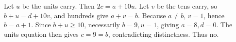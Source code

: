 Let $u$ be the units carry. Then $2c=a+10u$. Let $v$ be the tens carry, so $b+u=d+10v$, and hundreds give $a+v=b$. Because $a\ne b$, $v=1$, hence $b=a+1$. Since $b+u\ge10$, necessarily $b=9,u=1$, giving $a=8,d=0$. The units equation then gives $c=9=b$, contradicting distinctness. Thus $\boxed{\text{no}}$.
